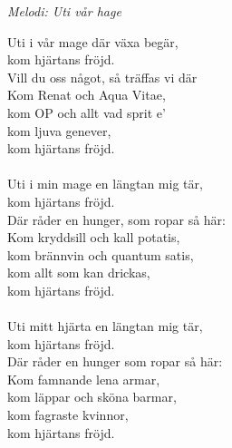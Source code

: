 {\footnotesize\textit{Melodi: Uti vår hage}}\par
\vspace{10pt}
Uti i vår mage där växa begär,\\
kom hjärtans fröjd.\\
Vill du oss något, så träffas vi där\\
Kom Renat och Aqua Vitae,\\
kom OP och allt vad sprit e'\\
kom ljuva genever,\\
kom hjärtans fröjd.\\
\\
Uti i min mage en längtan mig tär,\\
kom hjärtans fröjd.\\
Där råder en hunger, som ropar så här:\\
Kom kryddsill och kall potatis,\\
kom brännvin och quantum satis,\\
kom allt som kan drickas,\\
kom hjärtans fröjd.\\
\\
Uti mitt hjärta en längtan mig tär,\\
kom hjärtans fröjd.\\
Där råder en hunger som ropar så här:\\
Kom famnande lena armar,\\
kom läppar och sköna barmar,\\
kom fagraste kvinnor,\\
kom hjärtans fröjd.

